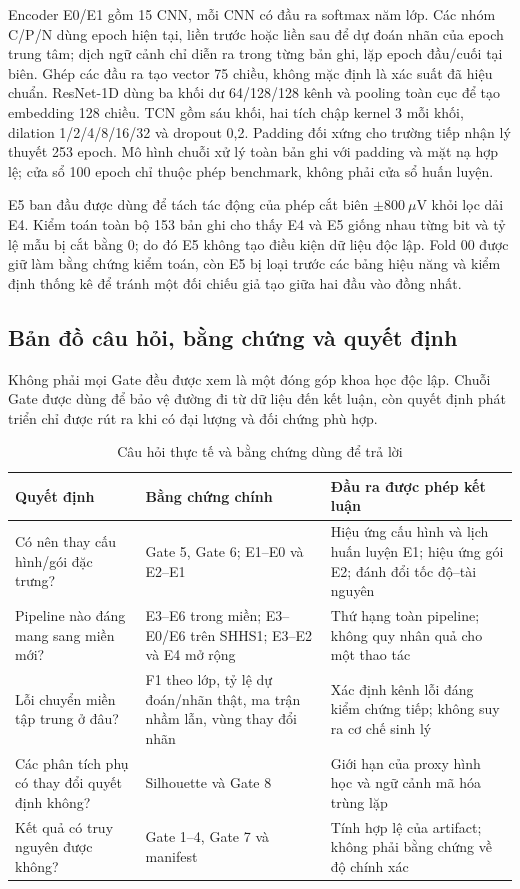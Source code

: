 Encoder E0/E1 gồm 15 CNN, mỗi CNN có đầu ra softmax năm lớp. Các nhóm C/P/N dùng epoch hiện tại, liền trước hoặc liền sau để dự đoán nhãn của epoch trung tâm; dịch ngữ cảnh chỉ diễn ra trong từng bản ghi, lặp epoch đầu/cuối tại biên. Ghép các đầu ra tạo vector 75 chiều, không mặc định là xác suất đã hiệu chuẩn. ResNet-1D dùng ba khối dư 64/128/128 kênh và pooling toàn cục để tạo embedding 128 chiều. TCN gồm sáu khối, hai tích chập kernel 3 mỗi khối, dilation 1/2/4/8/16/32 và dropout 0,2. Padding đối xứng cho trường tiếp nhận lý thuyết 253 epoch. Mô hình chuỗi xử lý toàn bản ghi với padding và mặt nạ hợp lệ; cửa sổ 100 epoch chỉ thuộc phép benchmark, không phải cửa sổ huấn luyện.

E5 ban đầu được dùng để tách tác động của phép cắt biên $\pm800~\mu\mathrm{V}$ khỏi lọc dải E4. Kiểm toán toàn bộ 153 bản ghi cho thấy E4 và E5 giống nhau từng bit và tỷ lệ mẫu bị cắt bằng 0; do đó E5 không tạo điều kiện dữ liệu độc lập. Fold 00 được giữ làm bằng chứng kiểm toán, còn E5 bị loại trước các bảng hiệu năng và kiểm định thống kê để tránh một đối chiếu giả tạo giữa hai đầu vào đồng nhất.

\subsection{Bản đồ câu hỏi, bằng chứng và quyết định}

Không phải mọi Gate đều được xem là một đóng góp khoa học độc lập. Chuỗi Gate được dùng để bảo vệ đường đi từ dữ liệu đến kết luận, còn quyết định phát triển chỉ được rút ra khi có đại lượng và đối chứng phù hợp.

\begin{table}[H]
\centering
\caption{Câu hỏi thực tế và bằng chứng dùng để trả lời}
\label{tab:question_evidence_map}
\begin{tabularx}{\textwidth}{YYY}
\toprule
\textbf{Quyết định} & \textbf{Bằng chứng chính} & \textbf{Đầu ra được phép kết luận} \\
\midrule
Có nên thay cấu hình/gói đặc trưng? & Gate 5, Gate 6; E1--E0 và E2--E1 & Hiệu ứng cấu hình và lịch huấn luyện E1; hiệu ứng gói E2; đánh đổi tốc độ--tài nguyên \\
Pipeline nào đáng mang sang miền mới? & E3--E6 trong miền; E3--E0/E6 trên SHHS1; E3--E2 và E4 mở rộng & Thứ hạng toàn pipeline; không quy nhân quả cho một thao tác \\
Lỗi chuyển miền tập trung ở đâu? & F1 theo lớp, tỷ lệ dự đoán/nhãn thật, ma trận nhầm lẫn, vùng thay đổi nhãn & Xác định kênh lỗi đáng kiểm chứng tiếp; không suy ra cơ chế sinh lý \\
Các phân tích phụ có thay đổi quyết định không? & Silhouette và Gate 8 & Giới hạn của proxy hình học và ngữ cảnh mã hóa trùng lặp \\
Kết quả có truy nguyên được không? & Gate 1--4, Gate 7 và manifest & Tính hợp lệ của artifact; không phải bằng chứng về độ chính xác \\
\bottomrule
\end{tabularx}
\end{table}

